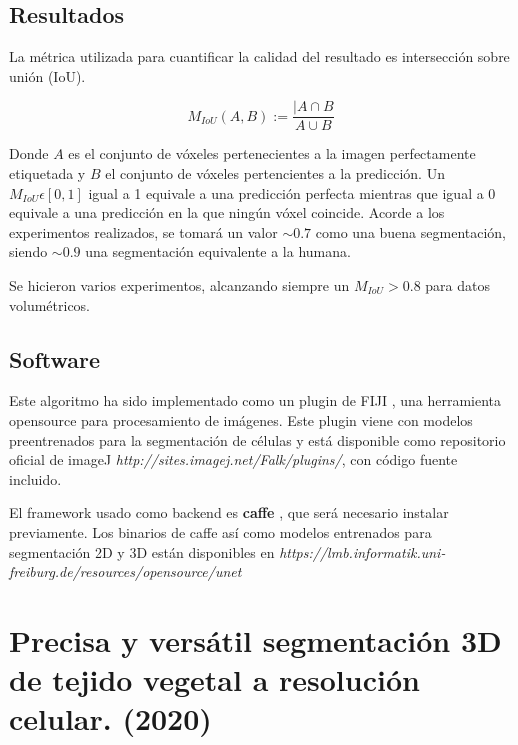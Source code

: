 \subsection{Resultados}


La métrica utilizada para cuantificar la calidad del resultado es intersección sobre unión (IoU).

\begin{equation}
M_{IoU}(A, B) := \frac{|A\cap B}{A\cup B}
\end{equation}

Donde $A$ es el conjunto de vóxeles pertenecientes a la imagen perfectamente etiquetada y $B$ el conjunto de vóxeles pertencientes a la predicción. Un $M_{IoU}\epsilon[0,1]$ igual a 1 equivale a una predicción perfecta mientras que igual a 0 equivale a una predicción en la que ningún vóxel coincide.
Acorde a los experimentos realizados, se tomará un valor $\sim0.7$ como una buena segmentación, siendo $\sim0.9$ una segmentación equivalente a la humana.

Se hicieron varios experimentos, alcanzando siempre un $M_{IoU}>0.8$ para datos volumétricos.

\subsection{Software}

Este algoritmo ha sido implementado como un plugin de FIJI \cite{Schindelin2012}, una herramienta opensource para procesamiento de imágenes. Este plugin viene con modelos preentrenados para la segmentación de células y está disponible como repositorio oficial de imageJ \textit{http://sites.imagej.net/Falk/plugins/}, con código fuente incluido.

El framework usado como backend es \textbf{caffe} \cite{Jia2014}, que será necesario instalar previamente. Los binarios de caffe así como modelos entrenados para segmentación 2D y 3D están disponibles en \textit{https://lmb.informatik.uni-freiburg.de/resources/opensource/unet}

\section{Precisa y versátil segmentación 3D de tejido vegetal a resolución celular. (2020)}


